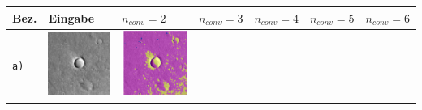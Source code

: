 \begin{table}[h!]
	\setlength\tabcolsep{0pt}
	\begin{tabularx}{\textwidth}{>{\centering}m{}
			>{\centering}m{}
			>{\centering}m{}
			>{\centering}m{}
			>{\centering}m{}
			>{\centering}m{}
			>{\centering\arraybackslash}m{}}
		\toprule
		Bez. &
		Eingabe & 
		$n_{conv}=2$ &
		$n_{conv}=3$ &
		$n_{conv}=4$ &
		$n_{conv}=5$ &
		$n_{conv}=6$ \\
		\midrule
		\texttt{a)} &
		\includegraphics[width=0.9\linewidth]{images/p03/p03_01.png} &
		\includegraphics[width=0.9\linewidth]{images/gen/convolution_number/p03_01.png_2.png} &

\end{tabularx}
\end{table}
